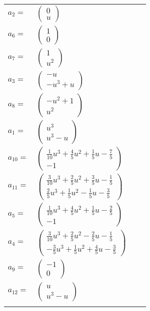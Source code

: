 \documentclass[1p]{elsarticle_modified}
\theoremstyle{definition}
\begin{document}
\begin{tabular}{m{7pt} m{180pt} m{7pt} m{180pt} }
\flushright $a_{2}=$&$\begin{pmatrix}0\\u\end{pmatrix}$ \\
\flushright $a_{6}=$&$\begin{pmatrix}1\\0\end{pmatrix}$ \\
\flushright $a_{7}=$&$\begin{pmatrix}1\\u^2\end{pmatrix}$ \\
\flushright $a_{3}=$&$\begin{pmatrix}- u\\- u^3+u\end{pmatrix}$ \\
\flushright $a_{8}=$&$\begin{pmatrix}- u^2+1\\u^2\end{pmatrix}$ \\
\flushright $a_{1}=$&$\begin{pmatrix}u^3\\u^3- u\end{pmatrix}$ \\
\flushright $a_{10}=$&$\begin{pmatrix}\frac{1}{10} u^3+\frac{4}{5} u^2+\frac{1}{5} u-\frac{7}{5}\\-1\end{pmatrix}$ \\
\flushright $a_{11}=$&$\begin{pmatrix}\frac{3}{10} u^3+\frac{2}{5} u^2+\frac{3}{5} u-\frac{1}{5}\\\frac{2}{5} u^3+\frac{1}{5} u^2-\frac{1}{5} u-\frac{3}{5}\end{pmatrix}$ \\
\flushright $a_{5}=$&$\begin{pmatrix}\frac{1}{10} u^3+\frac{4}{5} u^2+\frac{1}{5} u-\frac{2}{5}\\-1\end{pmatrix}$ \\
\flushright $a_{4}=$&$\begin{pmatrix}\frac{3}{10} u^3+\frac{2}{5} u^2-\frac{2}{5} u-\frac{1}{5}\\-\frac{3}{5} u^3+\frac{1}{5} u^2+\frac{4}{5} u-\frac{3}{5}\end{pmatrix}$ \\
\flushright $a_{9}=$&$\begin{pmatrix}-1\\0\end{pmatrix}$ \\
\flushright $a_{12}=$&$\begin{pmatrix}u\\u^3- u\end{pmatrix}$\\&\end{tabular}
\end{document}
